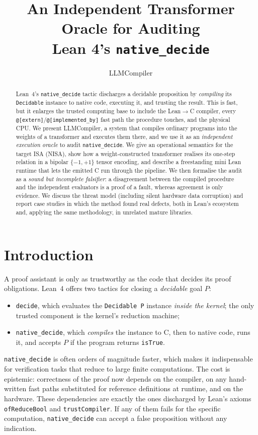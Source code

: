 \documentclass[11pt]{article}
\title{\bfseries An Independent Transformer Oracle for Auditing\\ Lean 4's \texttt{native\_decide}}
\author{LLMCompiler}
\date{}
\theoremstyle{definition}
\theoremstyle{plain}
\theoremstyle{remark}
\newcommand{\bp}{\{-1,+1\}}
\begin{document}
\maketitle

\begin{abstract}
Lean~4's \texttt{native\_decide} tactic discharges a decidable proposition by \emph{compiling} its
\texttt{Decidable} instance to native code, executing it, and trusting the result. This is fast, but
it enlarges the trusted computing base to include the Lean$\to$C compiler, every
\texttt{@[extern]}/\texttt{@[implemented\_by]} fast path the procedure touches, and the physical CPU.
We present LLMCompiler, a system that compiles ordinary programs into the weights of a transformer and
executes them there, and we use it as an \emph{independent execution oracle} to audit
\texttt{native\_decide}. We give an operational semantics for the target ISA (NISA), show how a
weight-constructed transformer realises its one-step relation in a bipolar $\bp$ tensor encoding, and
describe a freestanding mini Lean runtime that lets the emitted C run through the pipeline. We then
formalise the audit as a \emph{sound but incomplete falsifier}: a disagreement between the compiled
procedure and the independent evaluators is a proof of a fault, whereas agreement is only evidence.
We discuss the threat model (including silent hardware data corruption) and report case studies in
which the method found real defects, both in Lean's ecosystem and, applying the same methodology, in
unrelated mature libraries.
\end{abstract}

\section{Introduction}

A proof assistant is only as trustworthy as the code that decides its proof obligations. Lean~4
offers two tactics for closing a \emph{decidable} goal $P$:
\begin{itemize}[nosep]
  \item \texttt{decide}, which evaluates the \texttt{Decidable P} instance \emph{inside the kernel};
        the only trusted component is the kernel's reduction machine;
  \item \texttt{native\_decide}, which \emph{compiles} the instance to C, then to native code, runs
        it, and accepts $P$ if the program returns \texttt{isTrue}.
\end{itemize}
\texttt{native\_decide} is often orders of magnitude faster, which makes it indispensable for
verification tasks that reduce to large finite computations. The cost is epistemic: correctness of
the proof now depends on the compiler, on any hand-written fast paths substituted for reference
definitions at runtime, and on the hardware. These dependencies are exactly the ones discharged by
Lean's axioms \texttt{ofReduceBool} and \texttt{trustCompiler}. If any of them fails for the specific
computation, \texttt{native\_decide} can accept a false proposition without any indication.
\end{document}
